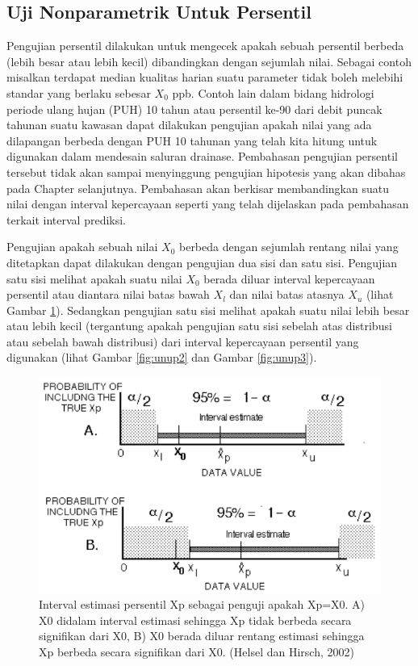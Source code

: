\documentclass[]{book}
\begin{document}
\subsection{Uji Nonparametrik Untuk
Persentil}\label{uji-nonparametrik-untuk-persentil}

Pengujian persentil dilakukan untuk mengecek apakah sebuah persentil
berbeda (lebih besar atau lebih kecil) dibandingkan dengan sejumlah
nilai. Sebagai contoh misalkan terdapat median kualitas harian suatu
parameter tidak boleh melebihi standar yang berlaku sebesar \(X_0\) ppb.
Contoh lain dalam bidang hidrologi periode ulang hujan (PUH) 10 tahun
atau persentil ke-90 dari debit puncak tahunan suatu kawasan dapat
dilakukan pengujian apakah nilai yang ada dilapangan berbeda dengan PUH
10 tahunan yang telah kita hitung untuk digunakan dalam mendesain
saluran drainase. Pembahasan pengujian persentil tersebut tidak akan
sampai menyinggung pengujian hipotesis yang akan dibahas pada Chapter
selanjutnya. Pembahasan akan berkisar membandingkan suatu nilai dengan
interval kepercayaan seperti yang telah dijelaskan pada pembahasan
terkait interval prediksi.

Pengujian apakah sebuah nilai \(X_0\) berbeda dengan sejumlah rentang
nilai yang ditetapkan dapat dilakukan dengan pengujian dua sisi dan satu
sisi. Pengujian satu sisi melihat apakah suatu nilai \(X_0\) berada
diluar interval kepercayaan persentil atau diantara nilai batas bawah
\(X_l\) dan nilai batas atasnya \(X_u\) (lihat Gambar \ref{fig:unup1}).
Sedangkan pengujian satu sisi melihat apakah suatu nilai lebih besar
atau lebih kecil (tergantung apakah pengujian satu sisi sebelah atas
distribusi atau sebelah bawah distribusi) dari interval kepercayaan
persentil yang digunakan (lihat Gambar \ref{fig:unup2} dan Gambar
\ref{fig:unup3}).

\begin{figure}

{\centering \includegraphics[width=0.65\linewidth]{unup1} 

}

\caption{Interval estimasi persentil Xp sebagai penguji apakah Xp=X0. A) X0 didalam interval estimasi sehingga Xp tidak berbeda secara signifikan dari X0, B) X0 berada diluar rentang estimasi sehingga Xp berbeda secara signifikan dari X0. (Helsel dan Hirsch, 2002)}\label{fig:unup1}
\end{figure}
\end{document}
